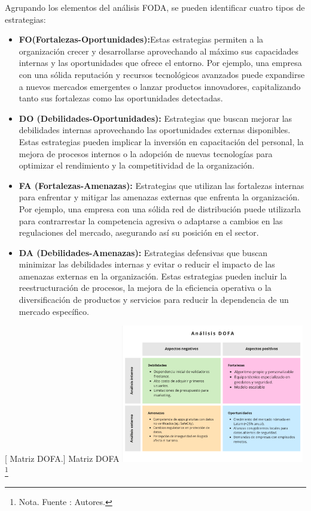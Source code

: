 Agrupando los elementos del análisis FODA, se pueden identificar cuatro tipos de estrategias:
\begin{itemize}
     \item \textbf{FO(Fortalezas-Oportunidades):}Estas estrategias permiten a la organización crecer y desarrollarse aprovechando al máximo sus capacidades internas y las oportunidades que ofrece el entorno. Por ejemplo, una empresa con una sólida reputación y recursos tecnológicos avanzados puede expandirse a nuevos mercados emergentes o lanzar productos innovadores, capitalizando tanto sus fortalezas como las oportunidades detectadas.
    \item \textbf{DO (Debilidades-Oportunidades):} Estrategias que buscan mejorar las debilidades internas aprovechando las oportunidades externas disponibles. Estas estrategias pueden implicar la inversión en capacitación del personal, la mejora de procesos internos o la adopción de nuevas tecnologías para optimizar el rendimiento y la competitividad de la organización.
    \item \textbf{FA (Fortalezas-Amenazas):} Estrategias que utilizan las fortalezas internas para enfrentar y mitigar las amenazas externas que enfrenta la organización. Por ejemplo, una empresa con una sólida red de distribución puede utilizarla para contrarrestar la competencia agresiva o adaptarse a cambios en las regulaciones del mercado, asegurando así su posición en el sector.
    \item \textbf{DA (Debilidades-Amenazas):} Estrategias defensivas que buscan minimizar las debilidades internas y evitar o reducir el impacto de las amenazas externas en la organización. Estas estrategias pueden incluir la reestructuración de procesos, la mejora de la eficiencia operativa o la diversificación de productos y servicios para reducir la dependencia de un mercado específico.
\end{itemize}

\begin{minipage}{0.9\textwidth}
\centering
{}[{ Matriz DOFA.}]{  Matriz DOFA }
\label{dofa}
\includegraphics[width=0.6\textwidth]{Content/Images/Matriz-dofa-proyecto.png}
\footnote{Nota. \textup{Fuente : Autores.}}
\end{minipage}


